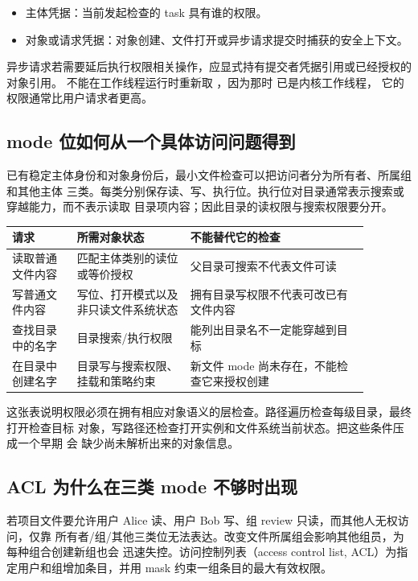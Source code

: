 \begin{itemize}
\tightlist
\item 主体凭据：当前发起检查的 task 具有谁的权限。
\item 对象或请求凭据：对象创建、文件打开或异步请求提交时捕获的安全上下文。
\end{itemize}

异步请求若需要延后执行权限相关操作，应显式持有提交者凭据引用或已经授权的对象引用。
不能在工作线程运行时重新取 ，因为那时  已是内核工作线程，
它的权限通常比用户请求者更高。

\subsection{mode 位如何从一个具体访问问题得到}

已有稳定主体身份和对象身份后，最小文件检查可以把访问者分为所有者、所属组和其他主体
三类。每类分别保存读、写、执行位。执行位对目录通常表示搜索或穿越能力，而不表示读取
目录项内容；因此目录的读权限与搜索权限要分开。

\begin{longtable}{|L{0.16\linewidth}|L{0.28\linewidth}|L{0.44\linewidth}|}
\hline
请求 & 所需对象状态 & 不能替代它的检查 \\ \hline
读取普通文件内容 & 匹配主体类别的读位或等价授权 & 父目录可搜索不代表文件可读 \\ \hline
写普通文件内容 & 写位、打开模式以及非只读文件系统状态 & 拥有目录写权限不代表可改已有文件内容 \\ \hline
查找目录中的名字 & 目录搜索/执行权限 & 能列出目录名不一定能穿越到目标 \\ \hline
在目录中创建名字 & 目录写与搜索权限、挂载和策略约束 & 新文件 mode 尚未存在，不能检查它来授权创建 \\ \hline
\end{longtable}

这张表说明权限必须在拥有相应对象语义的层检查。路径遍历检查每级目录，最终打开检查目标
对象，写路径还检查打开实例和文件系统当前状态。把这些条件压成一个早期  会
缺少尚未解析出来的对象信息。

\subsection{ACL 为什么在三类 mode 不够时出现}

若项目文件要允许用户 Alice 读、用户 Bob 写、组 review 只读，而其他人无权访问，仅靠
所有者/组/其他三类位无法表达。改变文件所属组会影响其他组员，为每种组合创建新组也会
迅速失控。访问控制列表（access control list, ACL）为指定用户和组增加条目，并用 mask
约束一组条目的最大有效权限。

